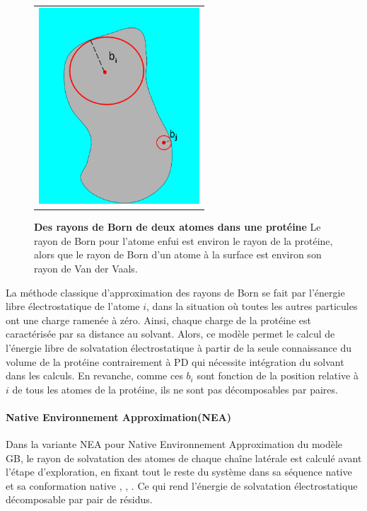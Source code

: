    \begin{figure}[!htbp]
     \centering
     \begin{tabular}{c}
       \includegraphics[width=6cm]{figure/rayon_Born.png} &
     \end{tabular}
     
     \caption{\textbf{Des rayons de Born de deux atomes dans une protéine} Le rayon de Born pour l'atome enfui est environ le rayon de la protéine, alors que le rayon de Born d'un atome à la surface est environ son rayon de Van der Vaals.} 
\label{graph:rayonBorn}
   \end{figure}


La méthode classique d'approximation des rayons de Born se fait par l'énergie libre électrostatique de l'atome $i$, dans la situation où toutes les autres particules ont une charge ramenée à zéro. Ainsi, chaque charge de la protéine est caractérisée par sa distance au solvant. Alors, ce modèle permet le calcul de l'énergie libre de solvatation électrostatique à partir de la seule connaissance du volume de la protéine contrairement à PD qui nécessite intégration du solvant dans les calculs. En revanche, comme ces $b_i$ sont fonction de la position relative à $i$ de tous les atomes de la protéine, ils ne sont pas décomposables par paires.
\paragraph{\og Native Environnement Approximation\fg (NEA)}
\label{NEA}
Dans la variante NEA pour \og Native Environnement Approximation \fg  du modèle GB, le rayon de solvatation des atomes de chaque chaîne latérale est calculé avant l'étape d'exploration, en fixant tout le reste du système dans sa séquence native et sa conformation native \cite {Polydorides11},\cite{Simonson13} , \cite{Gaillard14}. Ce qui rend l'énergie de solvatation électrostatique décomposable par pair de résidus.


